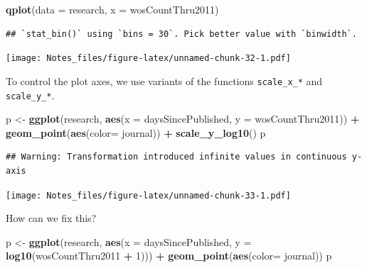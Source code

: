 \documentclass[
]{book}
\newenvironment{Shaded}{\begin{snugshade}}{\end{snugshade}}
\newcommand{\DataTypeTok}[1]{\textcolor[rgb]{0.13,0.29,0.53}{#1}}
\newcommand{\DecValTok}[1]{\textcolor[rgb]{0.00,0.00,0.81}{#1}}
\newcommand{\KeywordTok}[1]{\textcolor[rgb]{0.13,0.29,0.53}{\textbf{#1}}}
\newcommand{\NormalTok}[1]{#1}
\newcommand{\OperatorTok}[1]{\textcolor[rgb]{0.81,0.36,0.00}{\textbf{#1}}}
\newcommand{\StringTok}[1]{\textcolor[rgb]{0.31,0.60,0.02}{#1}}
\begin{document}
\begin{Shaded}
\begin{Highlighting}[]
\KeywordTok{qplot}\NormalTok{(}\DataTypeTok{data =}\NormalTok{ research, }\DataTypeTok{x =}\NormalTok{ wosCountThru2011)}
\end{Highlighting}
\end{Shaded}

\begin{verbatim}
## `stat_bin()` using `bins = 30`. Pick better value with `binwidth`.
\end{verbatim}

\texttt{[image: Notes\_files/figure-latex/unnamed-chunk-32-1.pdf]}

To control the plot axes, we use variants of the functions \texttt{scale\_x\_*} and \texttt{scale\_y\_*}.

\begin{Shaded}
\begin{Highlighting}[]
\NormalTok{p <-}\StringTok{ }\KeywordTok{ggplot}\NormalTok{(research, }\KeywordTok{aes}\NormalTok{(}\DataTypeTok{x =}\NormalTok{ daysSincePublished, }
                          \DataTypeTok{y =}\NormalTok{ wosCountThru2011)) }\OperatorTok{+}\StringTok{ }
\StringTok{  }\KeywordTok{geom_point}\NormalTok{(}\KeywordTok{aes}\NormalTok{(}\DataTypeTok{color=}\NormalTok{ journal)) }\OperatorTok{+}
\StringTok{  }\KeywordTok{scale_y_log10}\NormalTok{()}
\NormalTok{p}
\end{Highlighting}
\end{Shaded}

\begin{verbatim}
## Warning: Transformation introduced infinite values in continuous y-axis
\end{verbatim}

\texttt{[image: Notes\_files/figure-latex/unnamed-chunk-33-1.pdf]}

How can we fix this?

\begin{Shaded}
\begin{Highlighting}[]
\NormalTok{p <-}\StringTok{ }\KeywordTok{ggplot}\NormalTok{(research, }\KeywordTok{aes}\NormalTok{(}\DataTypeTok{x =}\NormalTok{ daysSincePublished, }
                          \DataTypeTok{y =} \KeywordTok{log10}\NormalTok{(wosCountThru2011 }\OperatorTok{+}\StringTok{ }\DecValTok{1}\NormalTok{))) }\OperatorTok{+}\StringTok{ }
\StringTok{  }\KeywordTok{geom_point}\NormalTok{(}\KeywordTok{aes}\NormalTok{(}\DataTypeTok{color=}\NormalTok{ journal))}
\NormalTok{p}
\end{Highlighting}
\end{Shaded}
\end{document}
